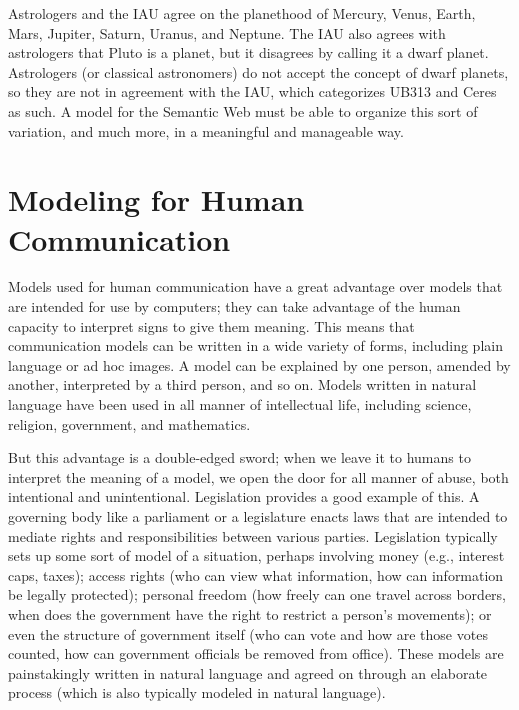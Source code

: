 Astrologers and the IAU agree on the planethood of Mercury, Venus,
Earth, Mars, Jupiter, Saturn,
Uranus, and Neptune. The IAU also agrees with astrologers that Pluto is
a planet, but it disagrees by calling it a dwarf planet. Astrologers (or
classical astronomers) do not accept the concept of dwarf planets, so
they are not in agreement with the IAU, which categorizes UB313 and
Ceres as such. A model for the Semantic Web must be able to organize
this sort of variation, and much more, in a meaningful and manageable
way.

\section{Modeling for Human Communication}

Models used for human communication have a great advantage over models
that are intended for use by computers; they can take advantage of the
human capacity to interpret signs to give them meaning. This means that
communication models can be written in a wide variety of forms,
including plain language or ad hoc images. A model can be explained by
one person, amended by another, interpreted
by a third person, and so on. Models written in natural language have
been used in all manner of intellectual life, including science,
religion, government, and mathematics.

But this advantage is a double-edged sword; when we leave it to humans
to interpret the meaning of a model, we open the door for all manner of
abuse, both intentional and unintentional. Legislation provides a good
example of this. A governing body like a parliament or a legislature
enacts laws that are intended to mediate rights and responsibilities
between various parties. Legislation typically sets up some sort of
model of a situation, perhaps involving money (e.g., interest caps,
taxes); access rights (who can view what information, how can
information be legally protected); personal freedom (how freely can one
travel across borders, when does the government have the right to
restrict a person's movements); or even the structure of government
itself (who can vote and how are those votes counted, how can government
officials be removed from office). These models are painstakingly
written in natural language and agreed on through an elaborate process
(which is also typically modeled in natural language).

